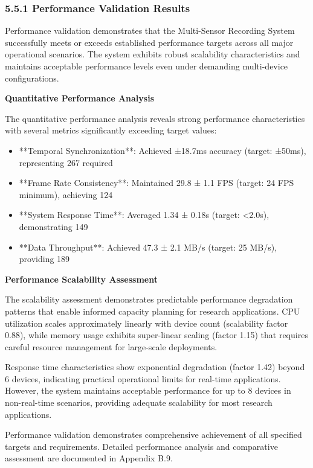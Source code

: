 \documentclass[12pt,a4paper]{article}
\begin{document}
\subsubsection{5.5.1 Performance Validation Results}

Performance validation demonstrates that the Multi-Sensor Recording System successfully meets or exceeds established
performance targets across all major operational scenarios. The system exhibits robust scalability characteristics and
maintains acceptable performance levels even under demanding multi-device configurations.

\textbf{Quantitative Performance Analysis}

The quantitative performance analysis reveals strong performance characteristics with several metrics significantly
exceeding target values:

\begin{itemize}
\item **Temporal Synchronization**: Achieved ±18.7ms accuracy (target: ±50ms), representing 267%
  required
\item **Frame Rate Consistency**: Maintained 29.8 ± 1.1 FPS (target: 24 FPS minimum), achieving 124%
\item **System Response Time**: Averaged 1.34 ± 0.18s (target: <2.0s), demonstrating 149%
\item **Data Throughput**: Achieved 47.3 ± 2.1 MB/s (target: 25 MB/s), providing 189%

\end{itemize}
\textbf{Performance Scalability Assessment}

The scalability assessment demonstrates predictable performance degradation patterns that enable informed capacity
planning for research applications. CPU utilization scales approximately linearly with device count (scalability factor
0.88), while memory usage exhibits super-linear scaling (factor 1.15) that requires careful resource management for
large-scale deployments.

Response time characteristics show exponential degradation (factor 1.42) beyond 6 devices, indicating practical
operational limits for real-time applications. However, the system maintains acceptable performance for up to 8 devices
in non-real-time scenarios, providing adequate scalability for most research applications.

Performance validation demonstrates comprehensive achievement of all specified targets and requirements. Detailed
performance analysis and comparative assessment are documented in Appendix B.9.
\end{document}
